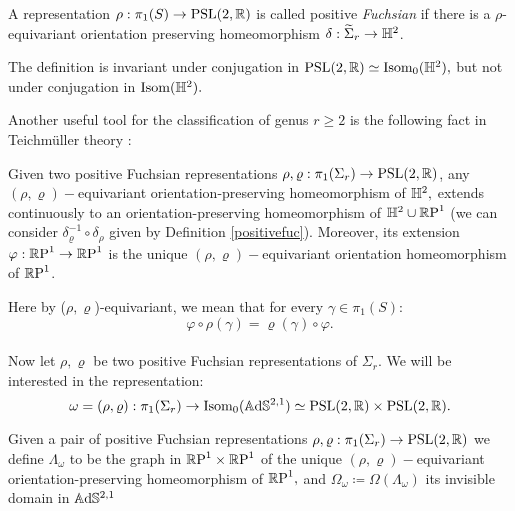 \begin{definition}\label{positivefuc}
    A representation $\rho:\pi_1(S)\to \text{PSL}(2,\mathbb{R})$ is called positive \textit{Fuchsian} if there is a $\rho$-equivariant orientation preserving homeomorphism $\delta:\widetilde{\Sigma}_r\to\mathbb{H}^2$.
\end{definition}

 The definition is invariant under conjugation in $\text{PSL}(2,\mathbb{R})\simeq\text{Isom}_0(\mathbb{H}^2),$ but not under conjugation in $\text{Isom}(\mathbb{H}^2).$ 
 
 

Another useful tool for the classification of genus $r\geq 2$ is the following fact in Teichm\"uller theory \cite{gardiner2000quasiconformal}:

\begin{lemma}
    Given two positive Fuchsian representations $\rho,\varrho:\pi_1(\Sigma_r)\to\text{PSL}(2,\mathbb{R})$, any $(\rho,\varrho)-$equivariant orientation-preserving homeomorphism of $\mathbb{H}^2,$ extends continuously to an orientation-preserving homeomorphism of $\mathbb{H}^2\cup\mathbb{R}\text{P}^1$ (we can consider $\delta_{\varrho}^{-1}\circ\delta_{\rho}$ given by Definition \ref{positivefuc}). Moreover, its extension $\varphi:\mathbb{R}\text{P}^1\to\mathbb{R}\text{P}^1$ is the unique $(\rho,\varrho)-$equivariant orientation homeomorphism of $\mathbb{R}\text{P}^1$.     
\end{lemma}

Here by ($\rho,\varrho$)-equivariant, we mean that for every $\gamma\in \pi_1(S)$:$$\varphi\circ\rho(\gamma)=\varrho(\gamma)\circ\varphi.$$\\
Now let $\rho,\varrho$ be two positive Fuchsian representations of $\Sigma_r.$ We will be interested in the representation:
\[
    \omega=(\rho,\varrho):\pi_1(\Sigma_r)\to\text{Isom}_0(\mathbb{A}\mathrm{d}\mathbb{S}^{2,1})\simeq \text{PSL}(2,\mathbb{R})\times\text{PSL}(2,\mathbb{R}).
\]
\begin{definition}
    Given a pair of positive Fuchsian representations $\rho,\varrho:\pi_1(\Sigma_r)\to\text{PSL}(2,\mathbb{R})$ we define $\Lambda_\omega$ to be the graph in $\mathbb{R}\text{P}^1\times\mathbb{R}\text{P}^1$ of the unique $(\rho,\varrho)-$equivariant orientation-preserving homeomorphism of $\mathbb{R}\text{P}^1,$ and $\Omega_\omega \coloneqq \Omega(\Lambda_{\omega} )$ its invisible domain in $\mathbb{A}\mathrm{d}\mathbb{S}^{2,1}$
\end{definition}

